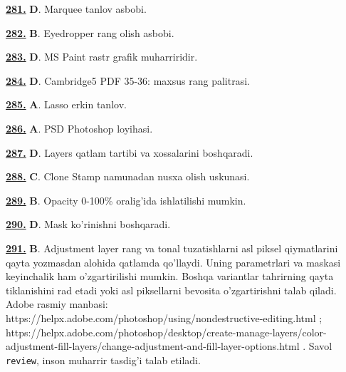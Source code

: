 \documentclass[10pt,a4paper,oneside]{article}
\begin{document}
\noindent\hyperlink{q281}{\textbf{281.}} \textbf{D}.  Marquee tanlov asbobi.
\par\vspace{3mm}
\noindent\hyperlink{q282}{\textbf{282.}} \textbf{B}.  Eyedropper rang olish asbobi.
\par\vspace{3mm}
\noindent\hyperlink{q283}{\textbf{283.}} \textbf{D}.  MS Paint rastr grafik muharriridir.
\par\vspace{3mm}
\noindent\hyperlink{q284}{\textbf{284.}} \textbf{D}.  Cambridge5 PDF 35-36: maxsus rang palitrasi.
\par\vspace{3mm}
\noindent\hyperlink{q285}{\textbf{285.}} \textbf{A}.  Lasso erkin tanlov.
\par\vspace{3mm}
\noindent\hyperlink{q286}{\textbf{286.}} \textbf{A}.  PSD Photoshop loyihasi.
\par\vspace{3mm}
\noindent\hyperlink{q287}{\textbf{287.}} \textbf{D}.  Layers qatlam tartibi va xossalarini boshqaradi.
\par\vspace{3mm}
\noindent\hyperlink{q288}{\textbf{288.}} \textbf{C}.  Clone Stamp namunadan nusxa olish uskunasi.
\par\vspace{3mm}
\noindent\hyperlink{q289}{\textbf{289.}} \textbf{B}.  Opacity 0-100\% oralig'ida ishlatilishi mumkin.
\par\vspace{3mm}
\noindent\hyperlink{q290}{\textbf{290.}} \textbf{D}.  Mask ko'rinishni boshqaradi.
\par\vspace{3mm}
\noindent\hyperlink{q291}{\textbf{291.}} \textbf{B}.  Adjustment layer rang va tonal tuzatishlarni asl piksel qiymatlarini qayta yozmasdan alohida qatlamda qo'llaydi. Uning parametrlari va maskasi keyinchalik ham o'zgartirilishi mumkin. Boshqa variantlar tahrirning qayta tiklanishini rad etadi yoki asl piksellarni bevosita o'zgartirishni talab qiladi. Adobe rasmiy manbasi: https://helpx.adobe.com/photoshop/using/nondestructive-editing.html ; https://helpx.adobe.com/photoshop/desktop/create-manage-layers/color-adjustment-fill-layers/change-adjustment-and-fill-layer-options.html . Savol \texttt{review}, inson muharrir tasdig'i talab etiladi.
\end{document}
